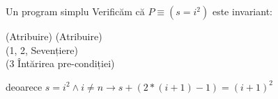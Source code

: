 \begin{frame}{Un program simplu}
Verificăm că $P \equiv (s = i^2)$ este invariant: 

\pause
\begin{enumerate}[<+->]
	\vitem {} \hfill (Atribuire)
	\vitem {} \hfill (Atribuire)
	\vitem {} \\ \hfill(1, 2, Sevențiere)
	\vitem {} \\ \hfill(3 Întărirea pre-condiției)

	  deoarece $s = i^2 \wedge i \neq n \to s+(2*(i+1)-1)=(i+1)^2$
\end{enumerate}
\end{frame}

